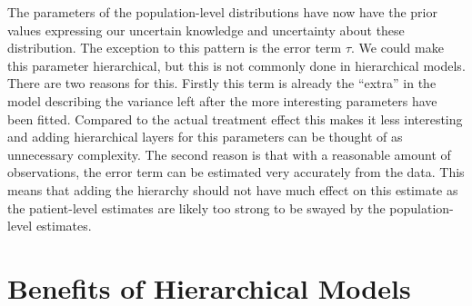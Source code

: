 \documentclass[12pt,a4paper,leqno]{report}
\theoremstyle{plain}
\theoremstyle{definition}
\theoremstyle{remark}
\begin{document}
The parameters of the population-level distributions have now have the prior values expressing our
uncertain knowledge and uncertainty about these distribution. The exception to this pattern is the error
term \(\tau \). We could make this parameter hierarchical, but this is not commonly done in hierarchical models. There are
two reasons for this. Firstly this term is already the ``extra'' in the model describing
the variance left after the more interesting parameters have been fitted. Compared to the actual
treatment effect this makes it less interesting and adding hierarchical layers for this
parameters can be thought of as unnecessary complexity. The second reason is that with a
reasonable amount of observations, the error term can be estimated very accurately from
the data. This means that adding the hierarchy should not have much effect on this estimate as the
patient-level estimates are likely too strong to be swayed by the population-level
estimates.

\section{Benefits of Hierarchical Models}
\end{document}
